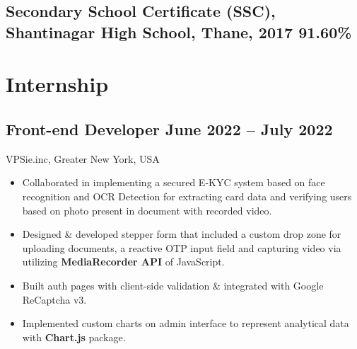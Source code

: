 \documentclass[a4,10pt]{article}
\newcommand{\subtext}[1]{
#1\par\vspace{-0.2cm}}
\newenvironment{zitemize}{
\begin{itemize}\itemsep0pt \parskip0pt \parsep1pt}
{\end{itemize}\vspace{-0.5cm}}
\begin{document}
\subsection*{Secondary School Certificate (SSC), {\normalsize \normalfont Shantinagar High School, Thane, 2017}  \hfill 91.60\%} 
\vspace{0.2cm}


\section{Internship}

        

\subsection*{Front-end Developer \hfill June 2022 -- July 2022} 
\subtext{VPSie.inc, Greater New York, USA} 
    \begin{zitemize}
        \item Collaborated in implementing a secured E-KYC system based on face recognition and OCR Detection for extracting card data and verifying users based on photo present in document with recorded video.
        \item Designed \& developed stepper form that included a custom drop zone for uploading documents, a reactive OTP input field and capturing video via utilizing \textbf{MediaRecorder API} of JavaScript.
        \item Built auth pages with client-side validation \& integrated with Google ReCaptcha v3.
        \item Implemented custom charts on admin interface to represent analytical data with \textbf{Chart.js} package.
    \end{zitemize}
\end{document}
